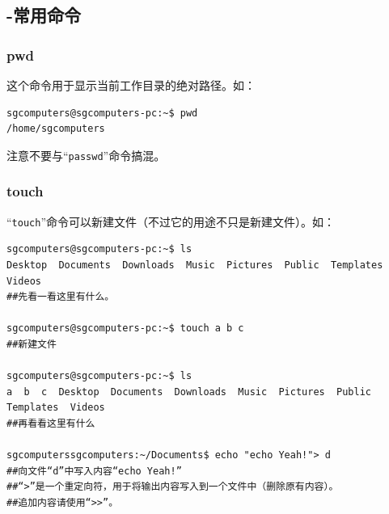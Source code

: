 \subsection{-常用命令}
\subsubsection{pwd}
这个命令用于显示当前工作目录的绝对路径。如：
\begin{verbatim}
sgcomputers@sgcomputers-pc:~$ pwd
/home/sgcomputers
\end{verbatim} \par
注意不要与“\verb|passwd|”命令搞混。
\subsubsection{touch}
\label{sec:nf}“\verb|touch|”命令可以新建文件（不过它的用途不只是新建文件）。如：
\begin{verbatim}
sgcomputers@sgcomputers-pc:~$ ls
Desktop  Documents  Downloads  Music  Pictures  Public  Templates  Videos
##先看一看这里有什么。

sgcomputers@sgcomputers-pc:~$ touch a b c
##新建文件

sgcomputers@sgcomputers-pc:~$ ls
a  b  c  Desktop  Documents  Downloads  Music  Pictures  Public  Templates  Videos
##再看看这里有什么

sgcomputerssgcomputers:~/Documents$ echo "echo Yeah!"> d
##向文件“d”中写入内容“echo Yeah!”
##“>”是一个重定向符，用于将输出内容写入到一个文件中（删除原有内容）。
##追加内容请使用“>>”。
\end{verbatim}
